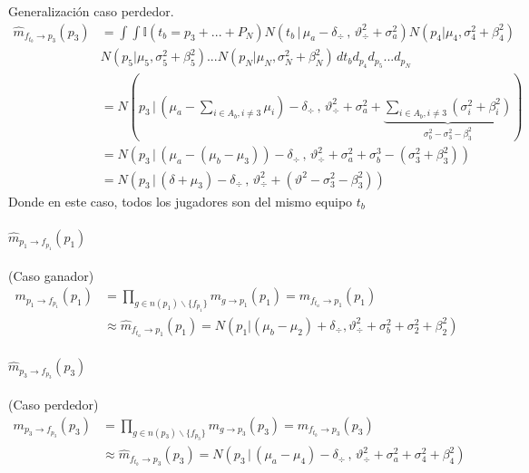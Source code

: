 \documentclass[11pt,twoside, spanish]{report} %
\begin{document}
Generalizaci\'on caso perdedor.
\begin{equation}
	\begin{split}
		\widehat{m}_{f_{t_b} \rightarrow p_3}(p_3) &=\int \int \mathbb{I}(t_b = p_3+ ...+ P_N) N(t_b \, | \, \mu_a - \delta_{\div} \, , \, \vartheta_{\div}^2 + \sigma_a^2) N(p_4 | \mu_4 , \sigma_4^2 + \beta_4^2)\\
		&N(p_5 | \mu_5 , \sigma_5^2 + \beta_5^2)... N(p_N | \mu_N , \sigma_N^2 + \beta_N^2)  \, d{t_b} d_{p_4}d_{p_5}...d_{p_N} \\
		&= N( p_3 \,|\, (\mu_a  - \sum_{i \in A_b, i\neq3} \mu_i) - \delta_{\div}  \,,\,\vartheta_{\div}^2 + \sigma_a^2 +\underbrace{\sum_{i \in A_b, i\neq3} (\sigma_i^2 + \beta_i^2)}_{\sigma_b^2 - \sigma_3^2 - \beta_3^2} ) \\
		&= N( p_3 \,|\, (\mu_a  -  (\mu_b-\mu_3)) - \delta_{\div}  \,,\,\vartheta_{\div}^2 + \sigma_a^2 + \sigma_b^3 -(\sigma_3^2 + \beta_3^2) ) \\
		& = N( p_3 \,|\, (\delta + \mu_3) - \delta_{\div}  \,,\,\vartheta_{\div}^2 + (\vartheta^2 - \sigma_3^2 - \beta_3^2))
	\end{split}
\end{equation}
Donde en este caso, todos los jugadores son del mismo equipo $t_b$


\paragraph{$\widehat{m}_{p_1 \rightarrow f_{p_1}}(p_1)$} (Caso ganador)
\begin{equation}
	\begin{split}
		m_{ p_1\rightarrow f_{p_1}}(p_1) &=  \prod_{g \in n(p_1) \backslash  \{f_{p_1} \}} m_{g \rightarrow p_1} (p_1)= m_{f_{t_a} \rightarrow p_1}(p_1) \\
		&\approx \widehat{m}_{f_{t_a} \rightarrow p_1}(p_1) =  N( p_1 |  (\mu_b - \mu_2) + \delta_{\div} ,\vartheta_{\div}^2 + \sigma_b^2 + \sigma_2^2 + \beta_2^2)
	\end{split}
\end{equation}

\paragraph{$\widehat{m}_{p_3 \rightarrow f_{p_3}}(p_3)$} (Caso perdedor)
\begin{equation}
	\begin{split}
		m_{ p_3\rightarrow f_{p_3}}(p_3) &= \prod_{g \in n(p_3) \backslash  \{f_{p_3} \}} m_{g \rightarrow p_3} (p_3) = m_{f_{t_b} \rightarrow p_3}(p_3)\\
		&\approx \widehat{m}_{f_{t_b} \rightarrow p_3}(p_3)=  N( p_3 \,|\,  (\mu_a - \mu_4) - \delta_{\div}  \,,\,\vartheta_{\div}^2 + \sigma_a^2 + \sigma_4^2 + \beta_4^2)
	\end{split}
\end{equation}
\end{document}
